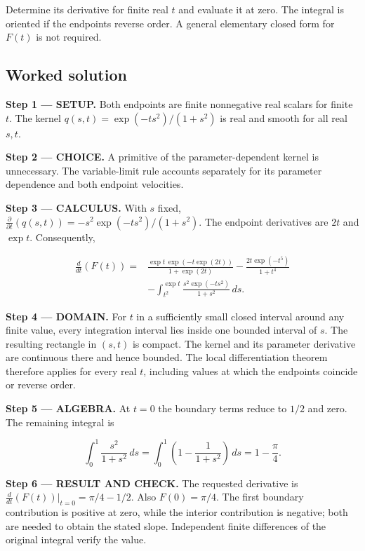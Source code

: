 \documentclass[11pt,oneside,openany]{book}
\begin{document}
Determine its derivative for finite real \(t\) and evaluate it at zero. The integral is oriented if the endpoints reverse order. A general elementary closed form for \(F(t)\) is not required.
\subsection*{Worked solution}

\textbf{Step 1 --- SETUP.} Both endpoints are finite nonnegative real scalars for finite \(t\). The kernel \(q(s,t)=\exp(-ts^2)/(1+s^2)\) is real and smooth for all real \(s,t\).

\begin{ChoiceStep}
\textbf{Step 2 --- CHOICE.} A primitive of the parameter-dependent kernel is unnecessary. The variable-limit rule accounts separately for its parameter dependence and both endpoint velocities.

\end{ChoiceStep}
\textbf{Step 3 --- CALCULUS.} With \(s\) fixed, \(\frac{\partial}{\partial t}(q(s,t))=-s^2\exp(-ts^2)/(1+s^2)\). The endpoint derivatives are \(2t\) and \(\exp t\). Consequently,

\[
\begin{aligned}
\frac{d}{dt}\left(F(t)\right)
={}&\frac{\exp t\,\exp(-t\exp(2t))}{1+\exp(2t)}
-\frac{2t\exp(-t^5)}{1+t^4}\\
&-\int_{t^2}^{\exp t}\frac{s^2\exp(-ts^2)}{1+s^2}\,ds.
\end{aligned}
\]

\begin{DomainStep}
\textbf{Step 4 --- DOMAIN.} For \(t\) in a sufficiently small closed interval around any finite value, every integration interval lies inside one bounded interval of \(s\). The resulting rectangle in \((s,t)\) is compact. The kernel and its parameter derivative are continuous there and hence bounded. The local differentiation theorem therefore applies for every real \(t\), including values at which the endpoints coincide or reverse order.

\end{DomainStep}
\begingroup\color{AlgebraBlue}
\textbf{Step 5 --- ALGEBRA.} At \(t=0\) the boundary terms reduce to \(1/2\) and zero. The remaining integral is

\[
\int_0^1\frac{s^2}{1+s^2}\,ds
=\int_0^1\left(1-\frac{1}{1+s^2}\right)\,ds=1-\frac\pi4.
\]

\endgroup
\textbf{Step 6 --- RESULT AND CHECK.} The requested derivative is \(\frac{d}{dt}(F(t))|_{t=0}=\pi/4-1/2\). Also \(F(0)=\pi/4\). The first boundary contribution is positive at zero, while the interior contribution is negative; both are needed to obtain the stated slope. Independent finite differences of the original integral verify the value.
\end{document}
